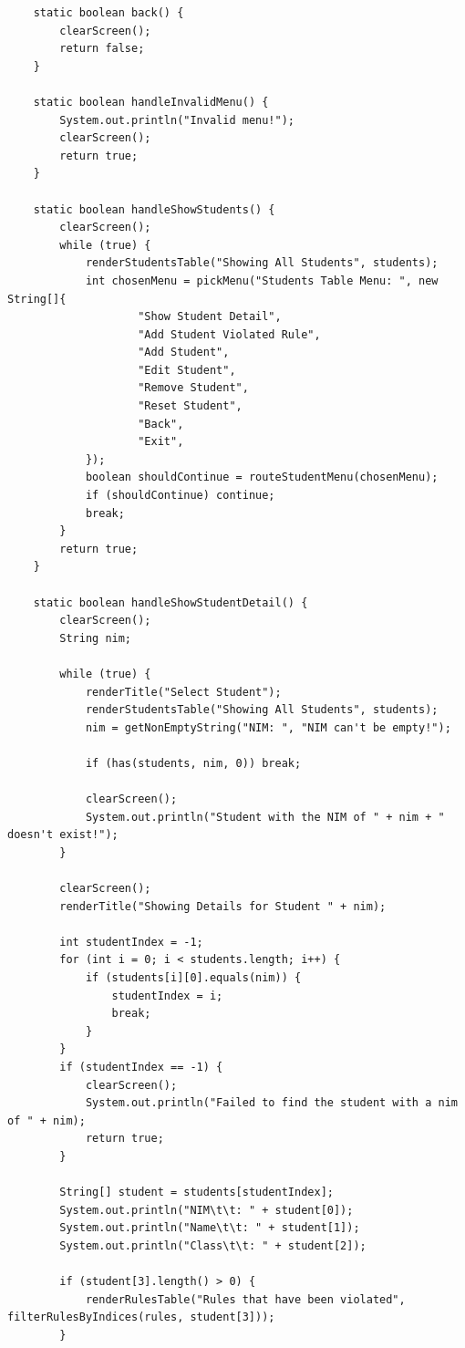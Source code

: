 \documentclass[12pt,titlepage]{article}
\begin{document}
\begin{verbatim}
    static boolean back() {
        clearScreen();
        return false;
    }

    static boolean handleInvalidMenu() {
        System.out.println("Invalid menu!");
        clearScreen();
        return true;
    }

    static boolean handleShowStudents() {
        clearScreen();
        while (true) {
            renderStudentsTable("Showing All Students", students);
            int chosenMenu = pickMenu("Students Table Menu: ", new String[]{
                    "Show Student Detail",
                    "Add Student Violated Rule",
                    "Add Student",
                    "Edit Student",
                    "Remove Student",
                    "Reset Student",
                    "Back",
                    "Exit",
            });
            boolean shouldContinue = routeStudentMenu(chosenMenu);
            if (shouldContinue) continue;
            break;
        }
        return true;
    }

    static boolean handleShowStudentDetail() {
        clearScreen();
        String nim;

        while (true) {
            renderTitle("Select Student");
            renderStudentsTable("Showing All Students", students);
            nim = getNonEmptyString("NIM: ", "NIM can't be empty!");

            if (has(students, nim, 0)) break;

            clearScreen();
            System.out.println("Student with the NIM of " + nim + " doesn't exist!");
        }

        clearScreen();
        renderTitle("Showing Details for Student " + nim);

        int studentIndex = -1;
        for (int i = 0; i < students.length; i++) {
            if (students[i][0].equals(nim)) {
                studentIndex = i;
                break;
            }
        }
        if (studentIndex == -1) {
            clearScreen();
            System.out.println("Failed to find the student with a nim of " + nim);
            return true;
        }

        String[] student = students[studentIndex];
        System.out.println("NIM\t\t: " + student[0]);
        System.out.println("Name\t\t: " + student[1]);
        System.out.println("Class\t\t: " + student[2]);

        if (student[3].length() > 0) {
            renderRulesTable("Rules that have been violated", filterRulesByIndices(rules, student[3]));
        }


\end{verbatim}
\end{document}
